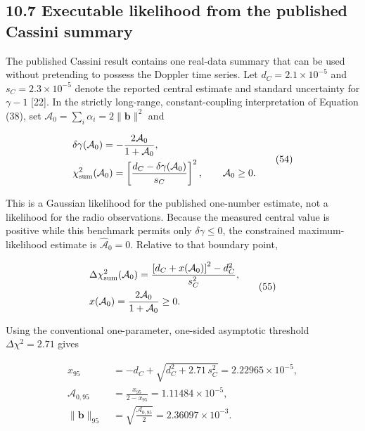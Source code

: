 \documentclass[
  american,
  11pt,
  letterpaper,
]{article}
\begin{document}
\subsection{10.7 Executable likelihood from the published Cassini summary}\label{executable-likelihood-from-the-published-cassini-summary}

The published Cassini result contains one real-data summary that can be used without pretending to possess the Doppler time series. Let \(d_C=2.1\times10^{-5}\) and \(s_C=2.3\times10^{-5}\) denote the reported central estimate and standard uncertainty for \(\gamma-1\) {[}22{]}. In the strictly long-range, constant-coupling interpretation of Equation (38), set \(\mathcal A_0=\sum_i\alpha_i=2\|\mathbf b\|^2\) and

\begin{equation}
\begin{aligned}
& \delta\gamma(\mathcal A_0)
=-\frac{2\mathcal A_0}{1+\mathcal A_0}, \\
& \chi^2_{\rm sum}(\mathcal A_0)
=\left[
\frac{d_C-\delta\gamma(\mathcal A_0)}{s_C}
\right]^2,
\qquad \mathcal A_0\geq0 .
\end{aligned}
\tag{54}
\end{equation}

This is a Gaussian likelihood for the published one-number estimate, not a likelihood for the radio observations. Because the measured central value is positive while this benchmark permits only \(\delta\gamma\leq0\), the constrained maximum-likelihood estimate is \(\widehat{\mathcal A}_0=0\). Relative to that boundary point,

\begin{equation}
\begin{aligned}
& \Delta\chi^2_{\rm sum}(\mathcal A_0)
=
\frac{\left[d_C+x(\mathcal A_0)\right]^2-d_C^2}{s_C^2}, \\
& x(\mathcal A_0)=\frac{2\mathcal A_0}{1+\mathcal A_0}\geq0 .
\end{aligned}
\tag{55}
\end{equation}

Using the conventional one-parameter, one-sided asymptotic threshold \(\Delta\chi^2=2.71\) gives

\[
\begin{aligned}
x_{95}
\;&=-d_C+\sqrt{d_C^2+2.71\,s_C^2}
=2.22965\times10^{-5},\\
\mathcal A_{0,95}
\;&=\frac{x_{95}}{2-x_{95}}
=1.11484\times10^{-5},\\
\|\mathbf b\|_{95}
\;&=\sqrt{\frac{\mathcal A_{0,95}}{2}}
=2.36097\times10^{-3}.
\end{aligned}
\tag{56}
\]
\end{document}
